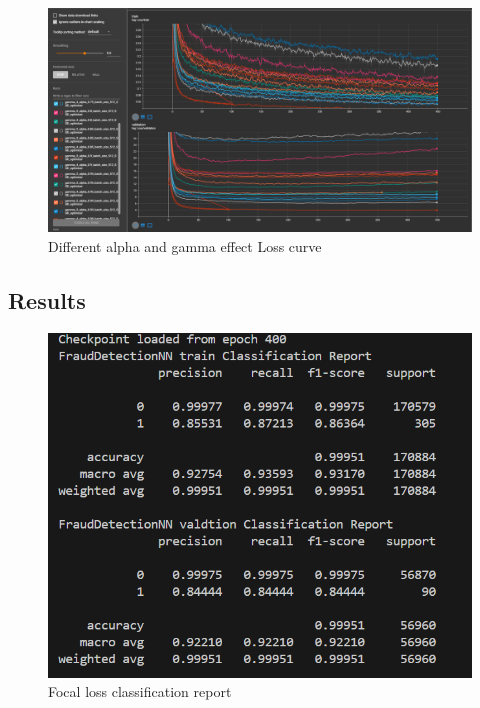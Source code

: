 \begin{figure}[h]
    \centering
    \includegraphics[width=1\linewidth]{different combination of Alpha and gamma.png}
    \caption{Different alpha and gamma effect Loss curve}
    \label{fig:Alpha and gamma}
\end{figure}

\subsection{Results}
\begin{figure}[h]
    \centering
    \includegraphics[width=0.8\linewidth]{Focal loss classification report.png}
    \caption{Focal loss classification report}
    \label{fig:Focal loss classification report}
\end{figure}


